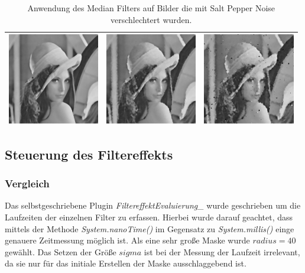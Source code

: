 \documentclass[12pt,german]{article}
\begin{document}
\begin{table}[H]
\begin{tabular}{| c | c | c |}
	\hline
	\includegraphics[width=4cm]{../testData/Median/LenaMedian.jpg} & \includegraphics[width=4cm]{../testData/Median/LenaNoiseR4.jpg} & \includegraphics[width=4cm]{../testData/Median/LenaNoisyNoiseR4.jpg} \\
	\hline

  \end{tabular}
  \caption{Anwendung des Median Filters auf Bilder die mit Salt Pepper Noise verschlechtert wurden.}
  \label{tab:Statistics}
\end{table}





\newpage
\subsection{Steuerung des Filtereffekts }

\subsubsection{Vergleich}
Das selbstgeschriebene Plugin \textit{FiltereffektEvaluierung\_} wurde geschrieben um die Laufzeiten der einzelnen Filter zu erfassen. Hierbei wurde darauf geachtet, dass mittels der Methode \textit{System.nanoTime()} im Gegensatz zu \textit{System.millis()} einge genauere Zeitmessung möglich ist. Als eine sehr große Maske wurde $  radius = 40 $ gewählt. Das Setzen der Größe $ sigma $ ist bei der Messung der Laufzeit irrelevant, da sie nur für das initiale Erstellen der Maske ausschlaggebend ist. \\
\end{document}
